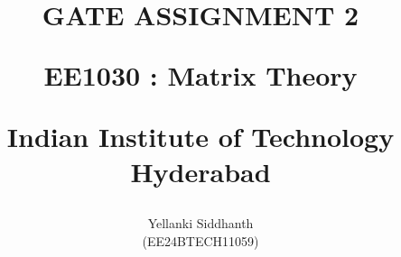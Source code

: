 \documentclass[journal]{IEEEtran}
\begin{document}

\onecolumn
\title{
GATE ASSIGNMENT 2

\large{EE1030 : Matrix Theory}

Indian Institute of Technology Hyderabad
}
\author{Yellanki Siddhanth

(EE24BTECH11059)
}	




\maketitle





\bigskip

\renewcommand{\thefigure}{\theenumi}
\renewcommand{\thetable}{\theenumi}
 
\end{document}
